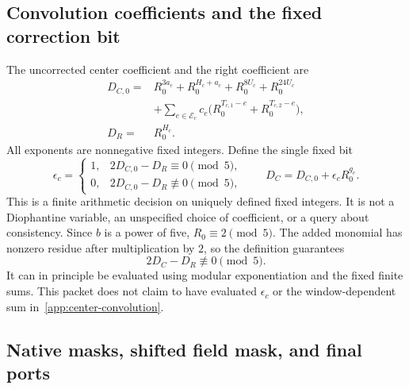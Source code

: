 \subsection{Convolution coefficients and the fixed correction bit}

The uncorrected center coefficient and the right coefficient are
\begin{align}
 D_{C,0}={}&R_0^{3a_c}+R_0^{H_c+a_c}
             +R_0^{8U_c}+R_0^{24U_c}\nonumber\\
 &+\sum_{e\in\mathcal E_c}c_e
       \bigl(R_0^{T_{c,1}-e}+R_0^{T_{c,2}-e}\bigr),
 \label{app:center-convolution}\\
 D_R={}&R_0^{H_c}.
 \label{app:right-convolution}
\end{align}
All exponents are nonnegative fixed integers. Define the single fixed bit
\begin{equation}\label{app:epsilon}
 \epsilon_c=
 \begin{cases}
 1,&2D_{C,0}-D_R\equiv0\pmod5,\\
 0,&2D_{C,0}-D_R\not\equiv0\pmod5,
 \end{cases}
 \qquad
 D_C=D_{C,0}+\epsilon_c R_0^{g_c}.
\end{equation}
This is a finite arithmetic decision on uniquely defined fixed integers.
It is not a Diophantine variable, an unspecified choice of coefficient,
or a query about consistency. Since $b$ is a power of five,
$R_0\equiv2\pmod5$. The added monomial has nonzero residue after
multiplication by $2$, so the definition guarantees
\[
 2D_C-D_R\not\equiv0\pmod5.
\]
It can in principle be evaluated using modular exponentiation and the
fixed finite sums. This packet does not claim to have evaluated
$\epsilon_c$ or the window-dependent sum in~\eqref{app:center-convolution}.

\subsection{Native masks, shifted field mask, and final ports}

